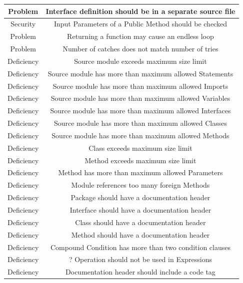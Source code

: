 \documentclass[da,ngerman]{stthesis}
\begin{document}
\begin{center}
\begin{longtabu}{|c|c|}
						\hline
						Problem & Interface definition should be in a separate source file \\
						\hline
						Security & Input Parameters of a Public Method should be checked \\
						\hline
						Problem & Returning a function may cause an endless loop \\
						\hline
						Problem & Number of catches does not match number of tries \\
						\hline
						Deficiency & Source module exceeds maximum size limit \\
						\hline
						Deficiency & Source module has more than maximum allowed Statements \\
						\hline
						Deficiency & Source module has more than maximum allowed Imports \\
						\hline
						Deficiency & Source module has more than maximum allowed Variables \\
						\hline
						Deficiency & Source module has more than maximum allowed Interfaces \\
						\hline
						Deficiency & Source module has more than maximum allowed Classes \\
						\hline
						Deficiency & Source module has more than maximum allowed Methods \\
						\hline
						Deficiency & Class exceeds maximum size limit \\
						\hline
						Deficiency & Method exceeds maximum size limit \\
						\hline
						Deficiency & Method has more than maximum allowed Parameters \\
						\hline
						Deficiency & Module references too many foreign Methods \\
						\hline
						Deficiency & Package should have a documentation header \\
						\hline
						Deficiency & Interface should have a documentation header \\
						\hline
						Deficiency & Class should have a documentation header \\
						\hline
						Deficiency & Method should have a documentation header \\
						\hline
						Deficiency & Compound Condition has more than two condition clauses \\
						\hline
						Deficiency & ? Operation should not be used in Expressions \\
						\hline
						Deficiency & Documentation header should include a code tag \\

\end{longtabu}
\end{center}
\end{document}
